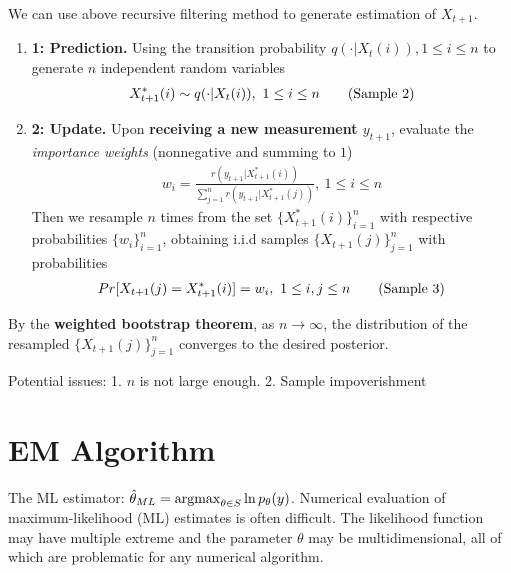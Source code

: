 \documentclass[11pt]{elegantbook}
\newcommand{\argmax}{\operatornamewithlimits{argmax}}
\begin{document}
We can use above recursive filtering method to generate estimation of $X_{t+1}$.
\begin{enumerate}
    \item \textbf{ 1: Prediction.} Using the transition probability $q(\cdot|X_t(i)),1\leq i\leq n$ to generate $n$ independent random variables
    \begin{equation}
        \begin{aligned}
            X^*_{t+1}(i)\sim q(\cdot|X_t(i)),\ 1\leq i\leq n
        \end{aligned}
        \tag{\text{Sample 2}}
    \end{equation}
    \item \textbf{ 2: Update.} Upon \textbf{receiving a new measurement $y_{t+1}$}, evaluate the \textit{importance weights} (nonnegative and summing to $1$)
    \begin{equation}
        \begin{aligned}
            w_i=\frac{r(y_{t+1}|X_{t+1}^*(i))}{\sum_{j=1}^n r(y_{t+1}|X_{t+1}^*(j))},\ 1\leq i\leq n
        \end{aligned}
        \nonumber
    \end{equation}
    Then we resample $n$ times from the set $\{X_{t+1}^*(i)\}_{i=1}^n$ with respective probabilities $\{w_i\}_{i=1}^n$, obtaining i.i.d samples $\{X_{t+1}(j)\}_{j=1}^n$ with probabilities
    \begin{equation}
        \begin{aligned}
            Pr[X_{t+1}(j)=X_{t+1}^*(i)]=w_i,\ 1\leq i,j\leq n
        \end{aligned}
        \tag{\text{Sample 3}}
    \end{equation}
\end{enumerate}
By the \textbf{weighted bootstrap theorem}, as $n \rightarrow \infty$, the distribution of the
resampled $\{X_{t+1}(j)\}_{j=1}^n$ converges to the desired posterior.


Potential issues: 1. $n$ is not large enough. 2. Sample impoverishment





\chapter{EM Algorithm}

The ML estimator: $\hat{\theta}_{ML}=\argmax_{\theta\in S}\ln p_\theta(y)$. Numerical evaluation of maximum-likelihood (ML) estimates is often difficult. The likelihood function may have multiple extreme and the parameter $\theta$ may be multidimensional, all of which are problematic for any numerical algorithm.
\end{document}

